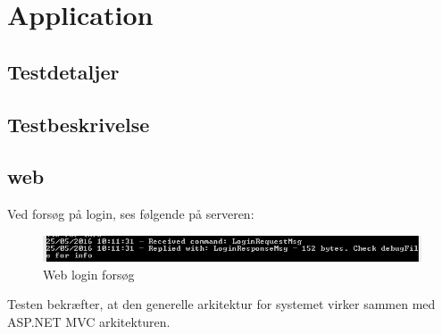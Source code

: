 \section{Application}\label{sec:testapplikation}

\subsection{Testdetaljer}



\subsection{Testbeskrivelse}


\subsection{web}
Ved forsøg på login, ses følgende på serveren:

\begin{figure}
	\centering
	\includegraphics[width=1.0\linewidth]{figs/implementering/webtest}
	\caption{Web login forsøg}
	\label{fig:weblogintry}
\end{figure}

Testen bekræfter, at den generelle arkitektur for systemet virker sammen med ASP.NET MVC arkitekturen. 
